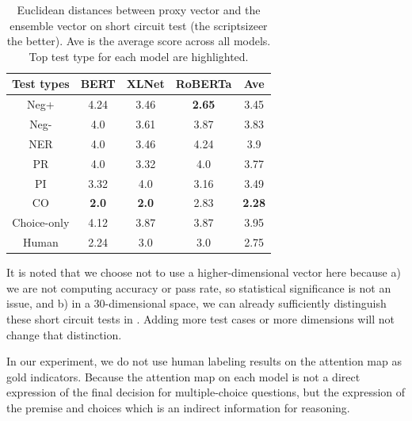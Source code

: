 \begin{table}[th]
    \scriptsize
    \centering
    \begin{tabular}{c|cccc}\hline
        \toprule  
        \textbf{Test types} &BERT  & XLNet & RoBERTa  &Ave\\ 
        \midrule
        {Neg+}      &  4.24     &   3.46  & \textbf{2.65}   &3.45\\
        \midrule
        {Neg-}&   4.0   &       3.61  & 3.87    &3.83\\
        \midrule
        {NER}    &   4.0    &  3.46      &  4.24    &3.9\\
        \midrule
        {PR}&    4.0    &    3.32   &   4.0 &3.77\\
        \midrule
        {PI}&   3.32    &    4.0    &   3.16    &3.49\\
        \midrule
        {CO}  &      \textbf{2.0}       &  \textbf{ 2.0} &  2.83    &\textbf{2.28}\\
        \midrule
        {Choice-only}   &  4.12     &3.87  &    3.87    &3.95\\
        \midrule
        {Human}   & 2.24    &   3.0&    3.0 &2.75\\
        \bottomrule
        \hline
    \end{tabular}
    \caption{\label{tab:agree} 
        Euclidean distances between proxy vector and 
        the ensemble vector on short circuit test (the scriptsizeer
        the better). 
        Ave is the average score across all models.
        Top test type for each model are highlighted.}
\end{table}

It is noted that we choose not to use a higher-dimensional vector
here because a) we are not computing accuracy or
pass rate, so statistical significance
is not an issue, and b) in a 30-dimensional space,
we can already sufficiently distinguish these short
circuit tests in . Adding more test cases
or more dimensions will not change that distinction.

In our experiment, we do not use human labeling results on the attention map 
as gold indicators.  Because the attention map on each model is not a direct 
expression of the final decision for multiple-choice questions, 
but the expression of the premise and choices which is an indirect information for reasoning.

